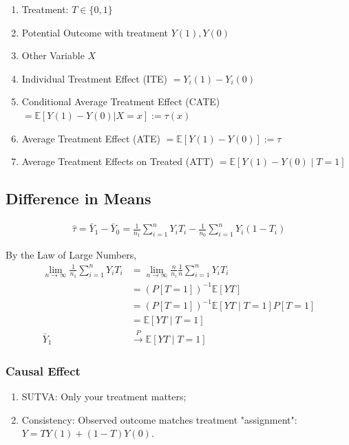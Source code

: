 \documentclass[11pt]{elegantbook}
\begin{document}
\begin{definition}
    \normalfont
    \begin{enumerate}[$\circ$]
        \item Treatment: $T\in\{0,1\}$
        \item Potential Outcome with treatment $Y(1), Y(0)$
        \item Other Variable $X$
        \item Individual Treatment Effect (ITE) $= Y_i(1)-Y_i(0)$
        \item Conditional Average Treatment Effect (CATE) $=\mathbb{E}[Y(1)-Y(0)|X=x]:=\tau(x)$
        \item Average Treatment Effect (ATE) $=\mathbb{E}[Y(1)-Y(0)]:=\tau$
        \item Average Treatment Effects on Treated (ATT) $=\mathbb{E}[Y(1)-Y(0)\mid T=1]$
    \end{enumerate}
\end{definition}


\subsection*{Difference in Means}
\begin{equation}
    \begin{aligned}
        \hat{\tau}=\bar{Y}_1-\bar{Y}_0=\frac{1}{n_1}\sum_{i=1}^n Y_i T_i - \frac{1}{n_0}\sum_{i=1}^n Y_i(1-T_i)
    \end{aligned}
    \nonumber
\end{equation}

By the Law of Large Numbers,
\begin{equation}
    \begin{aligned}
        \lim_{n \rightarrow \infty}\frac{1}{n_1}\sum_{i=1}^n Y_i T_i&=\lim_{n \rightarrow \infty}\frac{n}{n_i}\frac{1}{n}\sum_{i=1}^n Y_i T_i\\
        &=\left(P[T=1]\right)^{-1} \mathbb{E}[YT]\\
        &= \left(P[T=1]\right)^{-1}\mathbb{E}[YT\mid T=1]P[T=1]\\
        &=\mathbb{E}[YT\mid T=1]\\
        \bar{Y}_1 &\stackrel{P}{\longrightarrow} \mathbb{E}[YT\mid T=1]
    \end{aligned}
    \nonumber
\end{equation}

\subsubsection*{Causal Effect}
\begin{assumption}\quad
    \begin{enumerate}[(1).]
        \item SUTVA: Only your treatment matters;
        \item Consistency: Observed outcome matches treatment "assignment": $Y=TY(1)+(1-T)Y(0)$.
    \end{enumerate}
\end{assumption}
\end{document}
